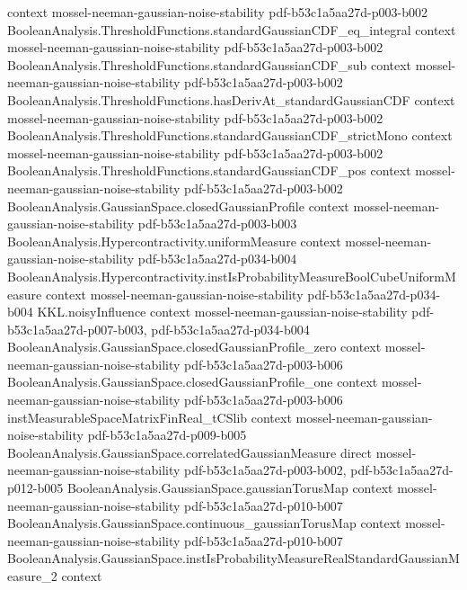 \begin{theorem}
  {context}
  {mossel-neeman-gaussian-noise-stability}
  {pdf-b53c1a5aa27d-p003-b002}
\proofstep
  {BooleanAnalysis.ThresholdFunctions.standardGaussianCDF_eq_integral}
  {context}
  {mossel-neeman-gaussian-noise-stability}
  {pdf-b53c1a5aa27d-p003-b002}
\proofstep
  {BooleanAnalysis.ThresholdFunctions.standardGaussianCDF_sub}
  {context}
  {mossel-neeman-gaussian-noise-stability}
  {pdf-b53c1a5aa27d-p003-b002}
\proofstep
  {BooleanAnalysis.ThresholdFunctions.hasDerivAt_standardGaussianCDF}
  {context}
  {mossel-neeman-gaussian-noise-stability}
  {pdf-b53c1a5aa27d-p003-b002}
\proofstep
  {BooleanAnalysis.ThresholdFunctions.standardGaussianCDF_strictMono}
  {context}
  {mossel-neeman-gaussian-noise-stability}
  {pdf-b53c1a5aa27d-p003-b002}
\proofstep
  {BooleanAnalysis.ThresholdFunctions.standardGaussianCDF_pos}
  {context}
  {mossel-neeman-gaussian-noise-stability}
  {pdf-b53c1a5aa27d-p003-b002}
\proofstep
  {BooleanAnalysis.GaussianSpace.closedGaussianProfile}
  {context}
  {mossel-neeman-gaussian-noise-stability}
  {pdf-b53c1a5aa27d-p003-b003}
\proofstep
  {BooleanAnalysis.Hypercontractivity.uniformMeasure}
  {context}
  {mossel-neeman-gaussian-noise-stability}
  {pdf-b53c1a5aa27d-p034-b004}
\proofstep
  {BooleanAnalysis.Hypercontractivity.instIsProbabilityMeasureBoolCubeUniformMeasure}
  {context}
  {mossel-neeman-gaussian-noise-stability}
  {pdf-b53c1a5aa27d-p034-b004}
\proofstep
  {KKL.noisyInfluence}
  {context}
  {mossel-neeman-gaussian-noise-stability}
  {pdf-b53c1a5aa27d-p007-b003,
    pdf-b53c1a5aa27d-p034-b004}
\proofstep
  {BooleanAnalysis.GaussianSpace.closedGaussianProfile_zero}
  {context}
  {mossel-neeman-gaussian-noise-stability}
  {pdf-b53c1a5aa27d-p003-b006}
\proofstep
  {BooleanAnalysis.GaussianSpace.closedGaussianProfile_one}
  {context}
  {mossel-neeman-gaussian-noise-stability}
  {pdf-b53c1a5aa27d-p003-b006}
\proofstep
  {instMeasurableSpaceMatrixFinReal_tCSlib}
  {context}
  {mossel-neeman-gaussian-noise-stability}
  {pdf-b53c1a5aa27d-p009-b005}
\proofstep
  {BooleanAnalysis.GaussianSpace.correlatedGaussianMeasure}
  {direct}
  {mossel-neeman-gaussian-noise-stability}
  {pdf-b53c1a5aa27d-p003-b002,
    pdf-b53c1a5aa27d-p012-b005}
\proofstep
  {BooleanAnalysis.GaussianSpace.gaussianTorusMap}
  {context}
  {mossel-neeman-gaussian-noise-stability}
  {pdf-b53c1a5aa27d-p010-b007}
\proofstep
  {BooleanAnalysis.GaussianSpace.continuous_gaussianTorusMap}
  {context}
  {mossel-neeman-gaussian-noise-stability}
  {pdf-b53c1a5aa27d-p010-b007}
\proofstep
  {BooleanAnalysis.GaussianSpace.instIsProbabilityMeasureRealStandardGaussianMeasure_2}
  {context}

\end{theorem}
